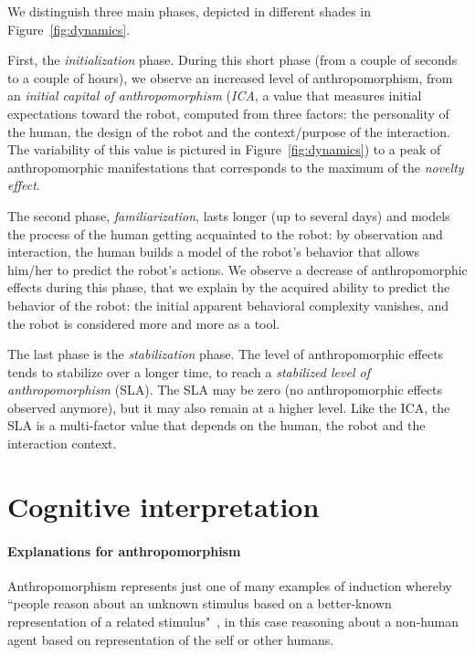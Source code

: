 \documentclass{sig-alternate-2013}
\begin{document}
We distinguish three main phases, depicted in different shades in
Figure~\ref{fig:dynamics}.

First, the \emph{initialization} phase. During this short phase (from a couple
of seconds to a couple of hours), we observe an increased level of
anthropomorphism, from an \emph{initial capital of anthropomorphism}
(\emph{ICA}, a value that measures initial expectations toward the robot,
computed from three factors: the personality of the human, the design of the
robot and the context/purpose of the interaction. The variability of this value
is pictured in Figure~\ref{fig:dynamics}) to a peak of anthropomorphic
manifestations that corresponds to the maximum of the \emph{novelty effect}.

The second phase, \emph{familiarization}, lasts longer (up to several days) and
models the process of the human getting acquainted to the robot: by observation
and interaction, the human builds a model of the robot's behavior that allows
him/her to predict the robot's actions. We observe a decrease of
anthropomorphic effects during this phase, that we explain by the acquired
ability to predict the behavior of the robot: the initial apparent behavioral
complexity vanishes, and the robot is considered more and more as a tool.

The last phase is the \emph{stabilization} phase. The level of anthropomorphic
effects tends to stabilize over a longer time, to reach a \emph{stabilized
level of anthropomorphism} (SLA). The SLA may be zero (no anthropomorphic
effects observed anymore), but it may also remain at a higher level. Like the
ICA, the SLA is a multi-factor value that depends on the human, the robot and
the interaction context.

\section{Cognitive interpretation}
\label{sec:cognitivemodel}

\paragraph{Explanations for anthropomorphism}

Anthropomorphism represents just one of many examples of induction whereby
``people reason about an unknown stimulus based on a better-known representation
of a related stimulus"~\cite{epley_when_2008}, in this case reasoning about a
non-human agent based on representation of the self or other humans.
\end{document}
